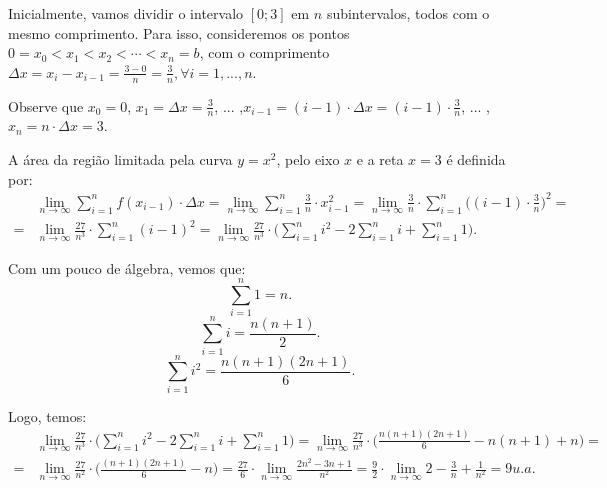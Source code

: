 \documentclass{article}
\begin{document}
{\begin{newpage}
\par Inicialmente, vamos dividir o intervalo $[0;3]$ em $n$ subintervalos, todos com o mesmo comprimento. Para isso, consideremos os pontos $0 = x_0 < x_1 < x_2 < \cdots < x_n = b$, com o comprimento $\displaystyle{\Delta x = x_i - x_{i-1} = \frac{3-0}{n} = \frac{3}{n}, \forall i=1,...,n.}$
\par Observe que $x_0 = 0$, $x_1 = \Delta x = \displaystyle{\frac{3}{n}}$, ... ,$x_{i-1} = (i-1)\cdot\Delta x = \displaystyle{(i-1)\cdot\frac{3}{n}}$, ... ,$x_n = n\cdot\Delta x = 3$.
\par A área da região limitada pela curva $y=x^2$, pelo eixo $x$ e a reta $x=3$ é definida por:
\begin{equation*} \displaystyle{\begin{split} &\lim_{n\to \infty } \sum_{i=1}^{n} f(x_{i-1})\cdot\Delta x = \lim_{n\to \infty } \sum_{i=1}^{n} \frac{3}{n}\cdot x^{2}_{i-1} = \lim_{n\to \infty } \frac{3}{n}\cdot\sum_{i=1}^{n} \Big( (i-1)\cdot\frac{3}{n} \Big)^{2} = \\ =&\lim_{n\to \infty } \frac{27}{n^3}\cdot\sum_{i=1}^{n} (i-1)^{2} = \lim_{n\to \infty } \frac{27}{n^3}\cdot\Big( \sum_{i=1}^{n} i^2 - 2\sum_{i=1}^{n} i + \sum_{i=1}^{n} 1 \Big) .  \end{split}} \end{equation*}
\par
\vspace{0.2cm}
\par Com um pouco de álgebra, vemos que:
\begin{equation*} \sum_{i=1}^{n} 1 = n. \end{equation*}
\begin{equation*} \sum_{i=1}^{n} i = \frac{n(n+1)}{2}. \end{equation*}
\begin{equation*} \sum_{i=1}^{n} i^{2} = \frac{n(n+1)(2n+1)}{6}. \end{equation*}
\par Logo, temos:
\begin{equation*}\displaystyle{\begin{split} &\lim_{n\to \infty } \frac{27}{n^3}\cdot\Big( \sum_{i=1}^{n} i^2 - 2\sum_{i=1}^{n} i + \sum_{i=1}^{n} 1           \Big) = \lim_{n\to \infty }\frac{27}{n^3}\cdot\Big( \frac{n(n+1)(2n+1)}{6} - n(n+1) + n \Big) = \\ =& \lim_{n\to \infty } \frac{27}{n^2}\cdot\Big( \frac{(n+1)(2n+1)}{6} - n \Big) = \frac{27}{6}\cdot\lim_{n\to \infty } \frac{2n^2 - 3n + 1}{n^2} = \frac{9}{2}\cdot\lim_{n\to \infty } 2 - \frac{3}{n} + \frac{1}{n^2} = 9u.a.  \end{split}} \end{equation*} 

\end{newpage}}
\end{document}
